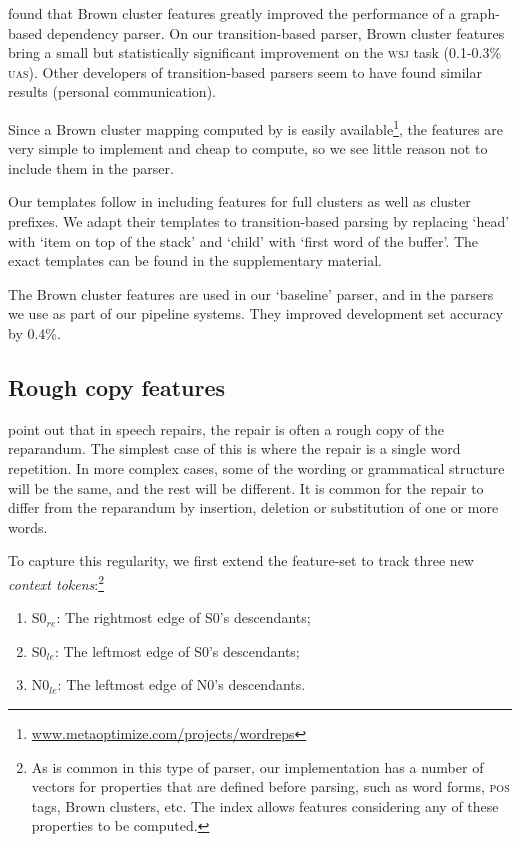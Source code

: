 \documentclass[11pt,letterpaper]{article}
\newcommand{\szero}{S0\xspace}
\newcommand{\nzero}{N0\xspace}
\newcommand{\szeroRedge}{S0$_{re}$\xspace}
\newcommand{\szeroLedge}{S0$_{le}$\xspace}
\newcommand{\nzeroLedge}{N0$_{le}$\xspace}
\begin{document}
\citet{koo:10} found that Brown cluster features greatly improved the performance
of a graph-based dependency parser. On our transition-based parser, Brown cluster
features bring a small but statistically significant improvement on the \textsc{wsj}
task (0.1-0.3\% \textsc{uas}).  Other developers of transition-based parsers
seem to have found similar results (personal communication).

Since a Brown cluster mapping computed by \citet{liang:05} is easily
available\footnote{\url{www.metaoptimize.com/projects/wordreps}}, the features
are very simple to implement and cheap to compute, so we see little reason not to include them
in the parser.

Our templates follow \citet{koo:10} in including features for full clusters as
well as cluster prefixes. We adapt their templates to transition-based parsing
by replacing `head' with `item on top of the stack' and `child' with `first word
of the buffer'. The exact templates can be found in the supplementary material.

The Brown cluster features are used in our `baseline' parser, and in the parsers
we use as part of our pipeline systems. They improved development set accuracy
by 0.4\%.

\subsection{Rough copy features}

\citet{Johnson04a} point out that in speech repairs, the repair is often a rough
copy of the reparandum.  The simplest case of this is where the repair is a single
word repetition. In more complex cases, some of the wording or grammatical
structure will be the same, and the rest will be different.  
It is common for the repair to differ from the reparandum by insertion, deletion
or substitution of one or more words.

To capture this regularity, we first extend the feature-set to track three new
\emph{context tokens}:\footnote{As is common
in this type of parser, our implementation has a number of vectors for properties
that are defined before parsing, such as word forms, \textsc{pos} tags, Brown
clusters, etc. The index allows features considering any of these
properties to be computed.}
\begin{enumerate}
    \itemsep0em
    \item \szeroRedge : The rightmost edge of \szero 's descendants;
    \item \szeroLedge : The leftmost edge of \szero 's descendants;
    \item \nzeroLedge : The leftmost edge of \nzero 's descendants.
\end{enumerate}
\end{document}
